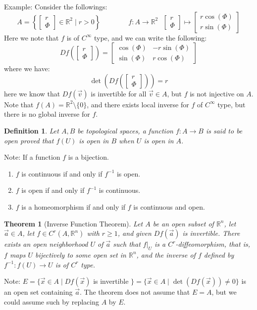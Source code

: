 \documentclass[15pt]{book}
\theoremstyle{break}
\theoremstyle{break}
\newtheorem{thm}{Theorem}[section]
\newtheorem{defn}{Definition}[corL]
\newcommand{\R}{\mathbb{R}}
\newcommand{\note}{\color{red}Note: \color{black}}
\newcommand{\example}{\color{green}Example: \color{black}}
\begin{document}
\example Consider the followings:
$$A = \left\{\begin{bmatrix} r\\\Phi \end{bmatrix} \in \R^2 \mid r>0\right\}\qquad\qquad f:A \to \R^2 \ \ \ \begin{bmatrix} r\\\Phi \end{bmatrix}\mapsto \begin{bmatrix} r\cos(\Phi)\\r\sin(\Phi )\end{bmatrix}$$ 
Here we note that $f$ is of $C^\infty$ type, and we can write the following: $$Df\left(\begin{bmatrix} r\\\Phi \end{bmatrix}\right) = \begin{bmatrix} \cos\left(\Phi\right)& -r\sin\left(\Phi\right)\\\sin\left(\Phi\right)&r\cos\left(\Phi\right) \end{bmatrix}$$
where we have: $$\det\left(Df\left(\begin{bmatrix} r\\\Phi \end{bmatrix}\right)\right) = r$$ here we know that $Df\left(\vec{v}\right)$ is invertible for all $\vec{v} \in A$, but $f$ is not injective on $A$. \\Note that $f\left(A\right) = \R^2 \setminus \{0\}$, and there exists local inverse for $f$ of $C^\infty$ type, but there is no global inverse for $f$.

\begin{defn}
Let $A,B$ be topological spaces, a function $f:A \to B$ is said to be open proved that $f(U)$ is open in $B$ when $U$ is open in $A$.
\end{defn}

\note If a function $f$ is a bijection.
\begin{enumerate}[topsep=3pt,itemsep=-1ex,partopsep=1ex,parsep=1ex]
\item $f$ is continuous if and only if $f^{-1}$ is open.
\item $f$ is open if and only if $f^{-1}$ is continuous.
\item $f$ is a homeomorphism if and only if $f$ is continuous and open.\\
\end{enumerate}
\newpage

\begin{thm}[Inverse Function Theorem]
Let $A $ be an open subset of $\R^n$, let $\vec{a}\in A$, let $f\in C^r(A,\R^n)$ with $r\geq 1$, and given $Df(\vec{a})$ is invertible. There exists an open neighborhood $U$ of $\vec{a}$ such that $f|_U$ is a $C^r$-diffeomorphism, that is, $f$ maps $U$ bijectively to some open set in $\R^n$, and the inverse of $f$ defined by $f^{-1}:f(U) \to U$ is of $C^r$ type. 
\end{thm}
\note $E = \{ \vec{x}\in A\mid Df(\vec{x})$ is invertible $\} = \{\vec{x}\in A \mid \det(Df(\vec{x})) \neq 0\}$ is an open set containing $\vec{a}$. The theorem does not assume that $E=A$, but we could assume such by replacing $A$ by $E$.
\end{document}
